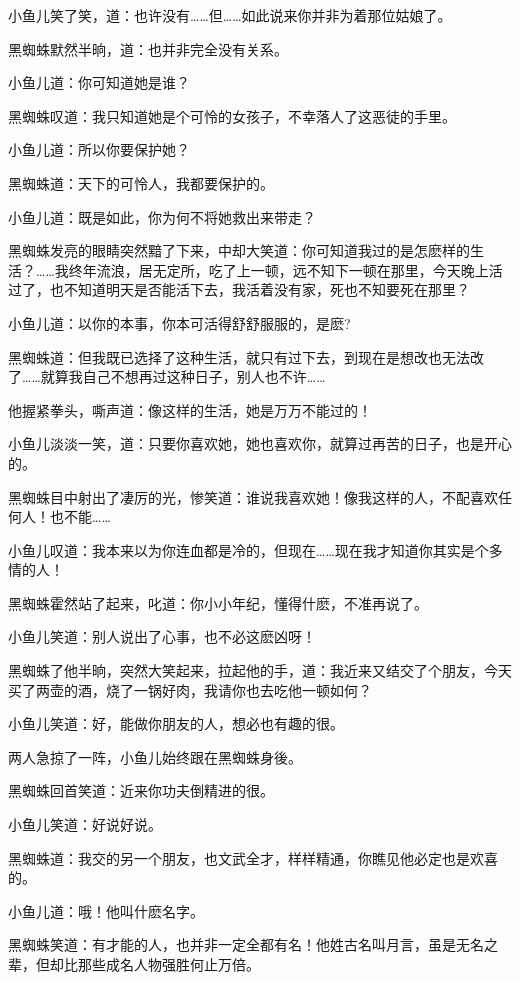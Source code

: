 \documentclass[12pt,oneside]{book}
\begin{document}
小鱼儿笑了笑，道：也许没有\ldots\ldots 但\ldots\ldots 如此说来你并非为着那位姑娘了。

黑蜘蛛默然半晌，道：也并非完全没有关系。

小鱼儿道：你可知道她是谁？

黑蜘蛛叹道：我只知道她是个可怜的女孩子，不幸落人了这恶徒的手里。

小鱼儿道：所以你要保护她？

黑蜘蛛道：天下的可怜人，我都要保护的。

小鱼儿道：既是如此，你为何不将她救出来带走？

黑蜘蛛发亮的眼睛突然黯了下来，中却大笑道：你可知道我过的是怎麽样的生活？\ldots\ldots 我终年流浪，居无定所，吃了上一顿，远不知下一顿在那里，今天晚上活过了，也不知道明天是否能活下去，我活着没有家，死也不知要死在那里？

小鱼儿道：以你的本事，你本可活得舒舒服服的，是麽?

黑蜘蛛道：但我既已选择了这种生活，就只有过下去，到现在是想改也无法改了\ldots\ldots 就算我自己不想再过这种日子，别人也不许\ldots\ldots{}

他握紧拳头，嘶声道：像这样的生活，她是万万不能过的！

小鱼儿淡淡一笑，道：只要你喜欢她，她也喜欢你，就算过再苦的日子，也是开心的。

黑蜘蛛目中射出了凄厉的光，惨笑道：谁说我喜欢她！像我这样的人，不配喜欢任何人！也不能\ldots\ldots{}

小鱼儿叹道：我本来以为你连血都是冷的，但现在\ldots\ldots 现在我才知道你其实是个多情的人！

黑蜘蛛霍然站了起来，叱道：你小小年纪，懂得什麽，不准再说了。

小鱼儿笑道：别人说出了心事，也不必这麽凶呀！

黑蜘蛛了他半晌，突然大笑起来，拉起他的手，道：我近来又结交了个朋友，今天买了两壶的酒，烧了一锅好肉，我请你也去吃他一顿如何？

小鱼儿笑道：好，能做你朋友的人，想必也有趣的很。

两人急掠了一阵，小鱼儿始终跟在黑蜘蛛身後。

黑蜘蛛回首笑道：近来你功夫倒精进的很。

小鱼儿笑道：好说好说。

黑蜘蛛道：我交的另一个朋友，也文武全才，样样精通，你瞧见他必定也是欢喜的。

小鱼儿道：哦！他叫什麽名字。

黑蜘蛛笑道：有才能的人，也并非一定全都有名！他姓古名叫月言，虽是无名之辈，但却比那些成名人物强胜何止万倍。
\end{document}
